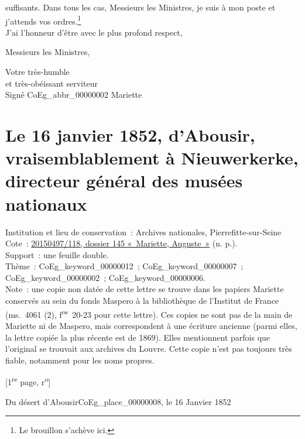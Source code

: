 \documentclass{book}
\begin{document}
suffisants. Dans tous les cas, Messieurs les Ministres, je suis à mon poste et j’attends vos ordres.\footnote{Le brouillon s’achève ici.}\\
\indent J’ai l’honneur d’être avec le plus profond respect,
\begin{center}Messieurs les Ministres,\end{center}
\begin{center}\hspace{5cm}Votre très-humble\\
\hspace{5cm}et très-obéissant serviteur\\
\hspace{5cm} Signé \gls{CoEg_abbr_00000002} Mariette\end{center}

\hypertarget{CoEg_Mariette_1852-01-16}{}
\section*{Le 16 janvier 1852, d’Abousir, vraisemblablement à Nieuwerkerke, directeur général des musées nationaux}
{\footnotesize
\noindent Institution et lieu de conservation~: Archives nationales, Pierrefitte-sur-Seine\\
Cote~: \hyperlink{CoEg_Mariette_ms_001}{20150497/118, dossier 145 «~Mariette, Auguste~»} (n. p.).\\
Support~: une feuille double.\\
Thème~: \gls{CoEg_keyword_00000012}~; \gls{CoEg_keyword_00000007}~; \gls{CoEg_keyword_00000002}~; \gls{CoEg_keyword_00000006}.\\
Note~: une copie non datée de cette lettre se trouve dans les papiers Mariette conservés au sein du fonds Maspero à la bibliothèque de l’Institut de France (ms.~4061 (2), f\textsuperscript{os}~20-23 pour cette lettre). Ces copies ne sont pas de la main de Mariette ni de Maspero, mais correspondent à une écriture ancienne (parmi elles, la lettre copiée la plus récente est de 1869). Elles mentionnent parfois que l’original se trouvait aux archives du Louvre. Cette copie n’est pas toujours très fiable, notamment pour les noms propres.
\begin{center} {[1\textsuperscript{re} page, r\textsuperscript{o}]}\end{center}}
\begin{flushright}Du désert d’Abousir\gls{CoEg_place_00000008}, le 16 Janvier 1852\end{flushright}
\end{document}
